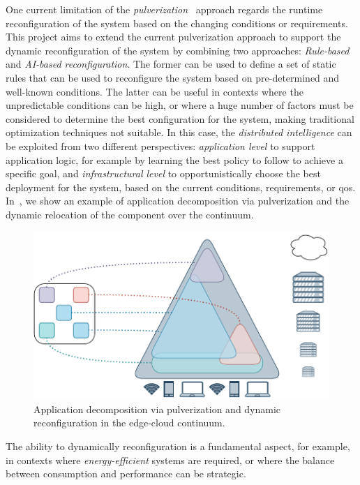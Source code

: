 \documentclass[12pt]{article}
\newcommand{\meta}[1]{{\color{blue}#1}}
\begin{document}
\meta{
One current limitation of the \emph{pulverization}~\cite{DBLP:journals/fi/CasadeiPPVW20} approach regards the runtime reconfiguration of the system based on the changing conditions or requirements.
%
This project aims to extend the current pulverization approach to support the dynamic reconfiguration of the system
by combining two approaches: \emph{Rule-based} and \emph{AI-based reconfiguration}.
%
The former can be used to define a set of static rules that can be used to reconfigure the system based on pre-determined and well-known conditions.
%
The latter can be useful in contexts where the unpredictable conditions can be high,
or where a huge number of factors must be considered to determine the best configuration for the system,
making traditional optimization techniques not suitable.
%
In this case,
the \emph{distributed intelligence} can be exploited from two different perspectives:
\emph{application level} to support application logic,
for example by learning the best policy to follow to achieve a specific goal,
and \emph{infrastructural level} to opportunistically choose the best deployment for the system,
based on the current conditions, requirements, or \ac{qos}.
%
In~\Cref{fig:ai-reconf},
we show an example of application decomposition via pulverization and the dynamic relocation of the component over the continuum.
%
\begin{figure}[ht]
	\centering
	\includegraphics[width=0.55\linewidth]{img/phd-proposal.drawio.pdf}
	\caption{Application decomposition via pulverization and dynamic reconfiguration in the edge-cloud continuum.}
	\label{fig:ai-reconf}
\end{figure}
%
The ability to dynamically reconfiguration is a fundamental aspect,
for example,
in contexts where \emph{energy-efficient} systems are required,
or where the balance between consumption and performance can be strategic.
}
\end{document}
